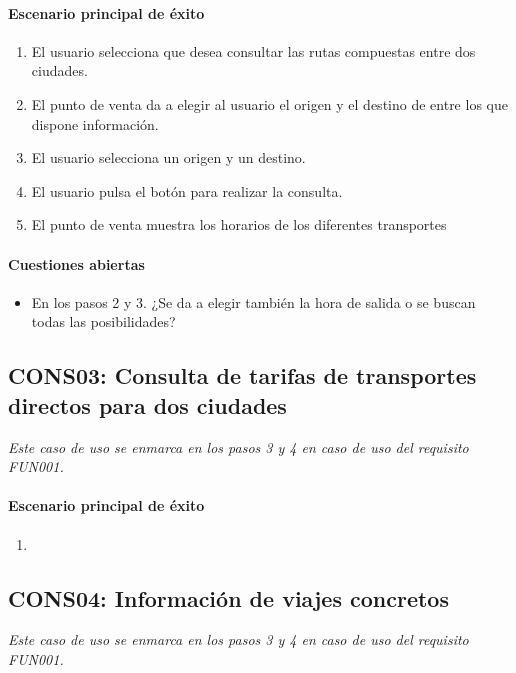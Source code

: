     \paragraph{Escenario principal de éxito}
    \begin{enumerate}
      \item El usuario selecciona que desea consultar las rutas compuestas entre dos ciudades.
      \item El punto de venta da a elegir al usuario el origen y el destino de entre los que dispone información.
      \item El usuario selecciona un origen y un destino.
      \item El usuario pulsa el botón para realizar la consulta.
      \item El punto de venta muestra los horarios de los diferentes transportes 
    \end{enumerate}

    \paragraph{Cuestiones abiertas}
    \begin{itemize}
       \item En los pasos 2 y 3. ¿Se da a elegir también la hora de salida o se buscan todas las posibilidades?
    \end{itemize}

  \subsection{CONS03: Consulta de tarifas de transportes directos para dos ciudades}
    \emph{Este caso de uso se enmarca en los pasos 3 y 4 en caso de uso del requisito FUN001.}
    \paragraph{Escenario principal de éxito}
    \begin{enumerate}
      \item 
    \end{enumerate}

  \subsection{CONS04: Información de viajes concretos}
    \emph{Este caso de uso se enmarca en los pasos 3 y 4 en caso de uso del requisito FUN001.}

